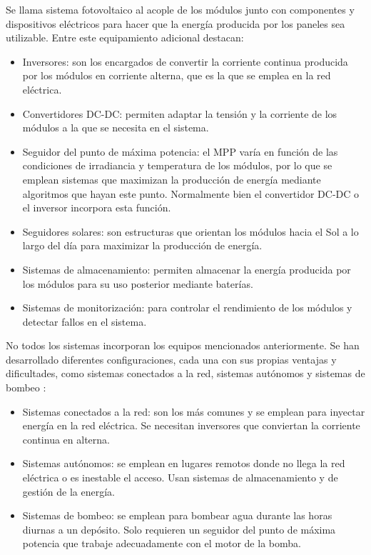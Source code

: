 Se llama \gls{sistema fotovoltaico} al acople de los módulos junto con componentes y dispositivos eléctricos para hacer que la energía producida por los paneles sea utilizable. Entre este equipamiento adicional destacan:

\begin{itemize}
      \item Inversores: son los encargados de convertir la corriente continua producida por los módulos en corriente alterna, que es la que se emplea en la red eléctrica.
      \item Convertidores DC-DC: permiten adaptar la tensión y la corriente de los módulos a la que se necesita en el sistema.
      \item Seguidor del punto de máxima potencia: el MPP varía en función de las condiciones de \gls{irradiancia} y temperatura de los módulos, por lo que se emplean sistemas que maximizan la producción de energía mediante algoritmos que hayan este punto. Normalmente bien el convertidor DC-DC o el inversor incorpora esta función.
      \item Seguidores solares: son estructuras que orientan los módulos hacia el Sol a lo largo del día para maximizar la producción de energía.
      \item Sistemas de almacenamiento: permiten almacenar la energía producida por los módulos para su uso posterior mediante baterías.
      \item Sistemas de monitorización: para controlar el rendimiento de los módulos y detectar fallos en el sistema.
\end{itemize}

No todos los sistemas incorporan los equipos mencionados anteriormente. Se han desarrollado diferentes configuraciones, cada una con sus propias ventajas y dificultades, como sistemas conectados a la red, \gls{sistemas autónomos} y \gls{sistemas de bombeo} \cite{Perpinan2020}:

\begin{itemize}
      \item Sistemas conectados a la red: son los más comunes y se emplean para inyectar energía en la red eléctrica. Se necesitan \gls{inversores} que conviertan la corriente continua en alterna.
      \item Sistemas autónomos: se emplean en lugares remotos donde no llega la red eléctrica o es inestable el acceso. Usan \gls{sistemas de almacenamiento} y de gestión de la energía.
      \item Sistemas de bombeo: se emplean para bombear agua durante las horas diurnas a un depósito. Solo requieren un seguidor del punto de máxima potencia que trabaje adecuadamente con el motor de la bomba.
\end{itemize}

